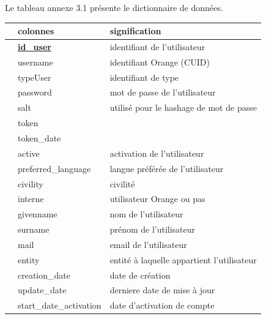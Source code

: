 Le tableau annexe 3.1 présente le dictionnaire de données.\\
\begin{longtable}[c]{|c|l|l|}
	\hline
	\rowcolor[HTML]{C0C0C0} 
	\multicolumn{1}{|l|}{\cellcolor[HTML]{C0C0C0}Classes} & colonnes     & signification                              \\ \hline
	\endhead
	& {\ul \textbf{id\_user}}   & identifiant de l'utilisateur               \\ \cline{2-3} 
	& username                  & identifiant Orange (CUID)                  \\ \cline{2-3} 
	& typeUser                  & identifiant de type                        \\ \cline{2-3} 
	& password                  & mot de passe de l'utilisateur              \\ \cline{2-3} 
	& salt                      & utilisé pour le hashage de mot de passe    \\ \cline{2-3} 
	& token                     &                                            \\ \cline{2-3} 
	& token\_date               &                                            \\ \cline{2-3} 
	& active                    & activation de l'utilisateur                \\ \cline{2-3} 
	& preferred\_language       & langue préférée de l'utilisateur           \\ \cline{2-3} 
	& civility                  & civilité                                   \\ \cline{2-3} 
	& interne                   & utilisateur Orange ou pas                  \\ \cline{2-3} 
	& givenname                 & nom de l'utilisateur                       \\ \cline{2-3} 
	& surname                   & prénom de l'utilisateur                    \\ \cline{2-3} 
	& mail                      & email de l'utilisateur                     \\ \cline{2-3} 
	& entity                    & entité à laquelle appartient l'utilisateur \\ \cline{2-3} 
	& creation\_date            & date de création                           \\ \cline{2-3} 
	& update\_date              & derniere date de mise à jour               \\ \cline{2-3} 
	& start\_date\_activation   & date d'activation de compte                \\ \cline{2-3} 

\end{longtable}
